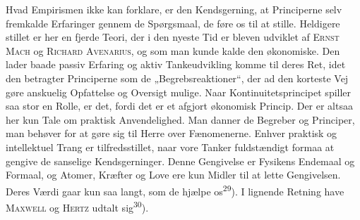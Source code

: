 \documentclass[12pt,a4paper,openany]{book}
\newcommand{\opage}[1]{\marginnote{\footnotesize\textit{[#1]}}}
\begin{document}
Hvad Empirismen ikke kan forklare, er den Kendsgerning, at Principerne selv
fremkalde Erfaringer gennem de Spørgsmaal, de føre os til at stille. Heldigere
stillet er her en fjerde Teori, der i den nyeste Tid er bleven udviklet af
\textsc{Ernst Mach} og \textsc{Richard Avenarius}, og som man kunde kalde den
økonomiske. Den lader baade passiv Erfaring og aktiv Tankeudvikling komme til
deres Ret, idet den betragter Principerne som de „Begrebsreaktioner“, der ad
den korteste Vej gøre anskuelig Opfattelse og Oversigt mulige. Naar
Kontinuitetsprincipet spiller saa stor
\opage{33}en Rolle, er det, fordi det er et afgjort økonomisk Princip. Der er
altsaa her kun Tale om praktisk Anvendelighed. Man danner de Begreber og
Principer, man behøver for at gøre sig til Herre over Fænomenerne. Enhver
praktisk og intellektuel Trang er tilfredsstillet, naar vore Tanker
fuldstændigt formaa at gengive de sanselige Kendsgerninger. Denne Gengivelse er
Fysikens Endemaal og Formaal, og Atomer, Kræfter og Love ere kun Midler til at
lette Gengivelsen. Deres Værdi gaar kun saa langt, som de hjælpe
os\textsuperscript{29}). I lignende Retning have \textsc{Maxwell} og
\textsc{Hertz} udtalt sig\textsuperscript{30}).
\end{document}
